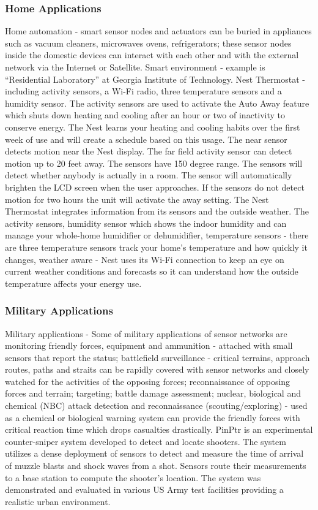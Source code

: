 \subsubsection{Home Applications}
Home automation \cite{homeautomation} - smart sensor nodes and actuators can be buried in appliances such as vacuum cleaners, microwaves ovens, refrigerators; these sensor nodes inside the domestic devices can interact with each other and with the external network via the Internet or Satellite. Smart environment \cite{smartenvironment} - example is “Residential Laboratory” at Georgia Institute of Technology. Nest Thermostat - including activity sensors, a Wi-Fi radio, three temperature sensors and a humidity sensor. The activity sensors are used to activate the Auto Away feature which shuts down heating and cooling after an hour or two of inactivity to conserve energy. The Nest learns your heating and cooling habits over the first week of use and will create a schedule based on this usage. 
The near sensor detects motion near the Nest display. The far field activity sensor can detect motion up to 20 feet away. The sensors have 150 degree range. The sensors will detect whether anybody is actually in a room. The sensor will automatically brighten the LCD screen when the user approaches. If the sensors do not detect motion for two hours the unit will activate the away setting. 
The Nest Thermostat integrates information from its sensors and the outside weather. The activity sensors, humidity sensor which shows the indoor humidity and can manage your whole-home humidifier or dehumidifier, temperature sensors - there are three temperature sensors track your home's temperature and how quickly it changes, weather aware - Nest uses its Wi-Fi connection to keep an eye on current weather conditions and forecasts so it can understand how the outside temperature affects your energy use. 

\subsubsection{Military Applications}
Military applications - Some of military applications of sensor networks are monitoring friendly forces, equipment and ammunition - attached with small sensors that report the status; battlefield surveillance - critical terrains, approach routes, paths and straits can be rapidly covered with sensor networks and closely watched for the activities of the opposing forces; reconnaissance of opposing forces and terrain; targeting; battle damage assessment; nuclear, biological and chemical (NBC) attack detection and reconnaissance (scouting/exploring) - used as a chemical or biological warning system can provide the friendly forces with critical reaction time which drops casualties drastically.
PinPtr \cite{Simonpinptr} is an experimental counter-sniper system developed to detect and locate shooters. The system utilizes a dense deployment of sensors to detect and measure the time of arrival of muzzle blasts and shock waves from a shot. Sensors route their measurements to a base station to compute the shooter's location. The system was demonstrated and evaluated in various US Army test facilities providing a realistic urban environment.

